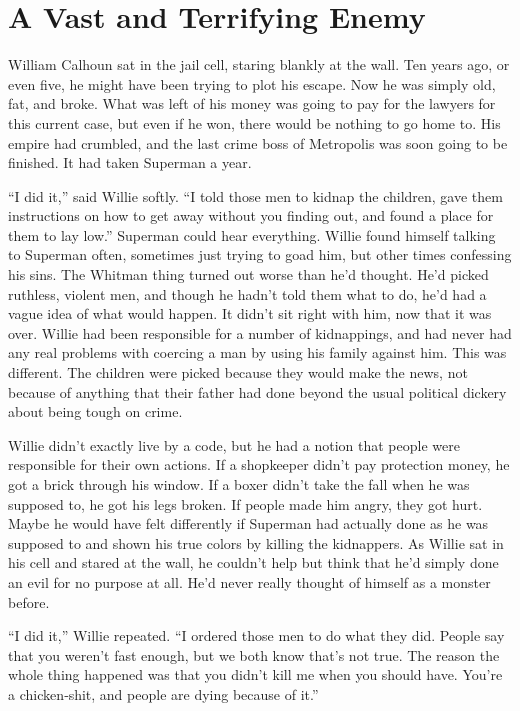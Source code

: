 \chapter{A Vast and Terrifying Enemy}\label{a-vast-and-terrifying-enemy}

William Calhoun sat in the jail cell, staring blankly at the wall. Ten
years ago, or even five, he might have been trying to plot his escape.
Now he was simply old, fat, and broke. What was left of his money was
going to pay for the lawyers for this current case, but even if he won,
there would be nothing to go home to. His empire had crumbled, and the
last crime boss of Metropolis was soon going to be finished. It had
taken Superman a year.

``I did it,'' said Willie softly. ``I told those men to kidnap the
children, gave them instructions on how to get away without you finding
out, and found a place for them to lay low.'' Superman could hear
everything. Willie found himself talking to Superman often, sometimes
just trying to goad him, but other times confessing his sins. The
Whitman thing turned out worse than he'd thought. He'd picked ruthless,
violent men, and though he hadn't told them what to do, he'd had a vague
idea of what would happen. It didn't sit right with him, now that it was
over. Willie had been responsible for a number of kidnappings, and had
never had any real problems with coercing a man by using his family
against him. This was different. The children were picked because they
would make the news, not because of anything that their father had done
beyond the usual political dickery about being tough on crime.

Willie didn't exactly live by a code, but he had a notion that people
were responsible for their own actions. If a shopkeeper didn't pay
protection money, he got a brick through his window. If a boxer didn't
take the fall when he was supposed to, he got his legs broken. If people
made him angry, they got hurt. Maybe he would have felt differently if
Superman had actually done as he was supposed to and shown his true
colors by killing the kidnappers. As Willie sat in his cell and stared
at the wall, he couldn't help but think that he'd simply done an evil
for no purpose at all. He'd never really thought of himself as a monster
before.

``I did it,'' Willie repeated. ``I ordered those men to do what they
did. People say that you weren't fast enough, but we both know that's
not true. The reason the whole thing happened was that you didn't kill
me when you should have. You're a chicken‐shit, and people are dying
because of it.''

